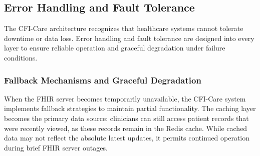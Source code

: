 \subsection{Error Handling and Fault Tolerance}
\label{subsec:error_handling}

The CFI-Care architecture recognizes that healthcare systems cannot tolerate
downtime or data loss. Error handling and fault tolerance are designed into
every layer to ensure reliable operation and graceful degradation under failure
conditions.




\subsubsection{Fallback Mechanisms and Graceful Degradation}
When the FHIR server becomes temporarily unavailable, the CFI-Care system
implements fallback strategies to maintain partial functionality. The caching
layer becomes the primary data source: clinicians can still access patient
records that were recently viewed, as these records remain in the Redis cache.
While cached data may not reflect the absolute latest updates, it permits
continued operation during brief FHIR server outages.

